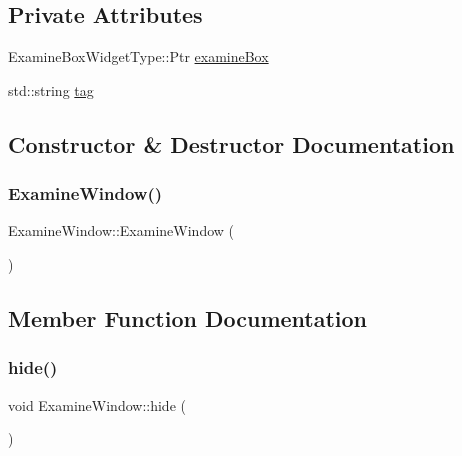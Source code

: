 \subsection*{Private Attributes}
\begin{DoxyCompactItemize}
\item 
Examine\+Box\+Widget\+Type\+::\+Ptr \mbox{\hyperlink{class_examine_window_ac2d48b2c4457c6e998eac5dafd2c3358}{examine\+Box}}
\item 
std\+::string \mbox{\hyperlink{class_examine_window_a37c9aa9a35067245eb8ed5f0f39f3e0b}{tag}}
\end{DoxyCompactItemize}


\subsection{Constructor \& Destructor Documentation}
\mbox{\label{class_examine_window_af33337f9792efd96f096b4689049557b}} 
\subsubsection{\texorpdfstring{Examine\+Window()}{ExamineWindow()}}
{\footnotesize\ttfamily Examine\+Window\+::\+Examine\+Window (\begin{DoxyParamCaption}{ }\end{DoxyParamCaption})}



\subsection{Member Function Documentation}
\mbox{\label{class_examine_window_a43f65ea7b98e29f773cdf0098ab0ed9c}} 
\subsubsection{\texorpdfstring{hide()}{hide()}}
{\footnotesize\ttfamily void Examine\+Window\+::hide (\begin{DoxyParamCaption}{ }\end{DoxyParamCaption})}

